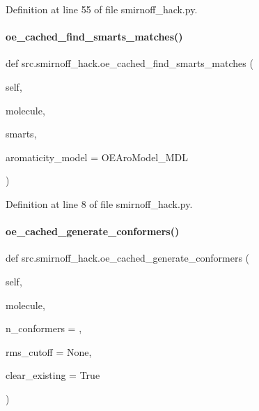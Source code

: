 Definition at line 55 of file smirnoff\+\_\+hack.\+py.

\mbox{\label{namespacesrc_1_1smirnoff__hack_afffd5f3b5ab48d5fd5e976ac1a7aea30}} 
\paragraph{\texorpdfstring{oe\+\_\+cached\+\_\+find\+\_\+smarts\+\_\+matches()}{oe\_cached\_find\_smarts\_matches()}}
{\footnotesize\ttfamily def src.\+smirnoff\+\_\+hack.\+oe\+\_\+cached\+\_\+find\+\_\+smarts\+\_\+matches (\begin{DoxyParamCaption}\item[{}]{self,  }\item[{}]{molecule,  }\item[{}]{smarts,  }\item[{}]{aromaticity\+\_\+model = {\ttfamily \textquotesingle{}OEAroModel\+\_\+MDL\textquotesingle{}} }\end{DoxyParamCaption})}



Definition at line 8 of file smirnoff\+\_\+hack.\+py.

\mbox{\label{namespacesrc_1_1smirnoff__hack_ab09604f96254abb1e900f34492aa89c4}} 
\paragraph{\texorpdfstring{oe\+\_\+cached\+\_\+generate\+\_\+conformers()}{oe\_cached\_generate\_conformers()}}
{\footnotesize\ttfamily def src.\+smirnoff\+\_\+hack.\+oe\+\_\+cached\+\_\+generate\+\_\+conformers (\begin{DoxyParamCaption}\item[{}]{self,  }\item[{}]{molecule,  }\item[{}]{n\+\_\+conformers = {},  }\item[{}]{rms\+\_\+cutoff = {\ttfamily None},  }\item[{}]{clear\+\_\+existing = {\ttfamily True} }\end{DoxyParamCaption})}



